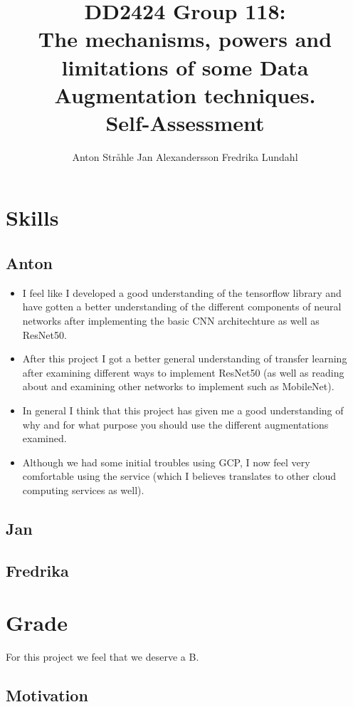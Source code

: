 \documentclass{article}
\title{DD2424 Group 118: \\ The mechanisms, powers and limitations of some Data Augmentation techniques. \\ Self-Assessment}
\author{%
  Anton Stråhle \And Jan Alexandersson \And Fredrika Lundahl}
\begin{document}
	
\maketitle

\section*{Skills}

\subsection*{Anton}

\begin{itemize}
 \item I feel like I developed a good understanding of the tensorflow library and have gotten a better understanding of the different components of neural networks after implementing the basic CNN architechture as well as ResNet50. 
 \item After this project I got a better general understanding of transfer learning after examining different ways to implement ResNet50 (as well as reading about and examining other networks to implement such as MobileNet). 
 \item In general I think that this project has given me a good understanding of why and for what purpose you should use the different augmentations examined.
 \item Although we had some initial troubles using GCP, I now feel very comfortable using the service (which I believes translates to other cloud computing services as well).
\end{itemize}


\subsection*{Jan}

\subsection*{Fredrika}

\section*{Grade}

For this project we feel that we deserve a B. 

\subsection*{Motivation}
\end{document}
